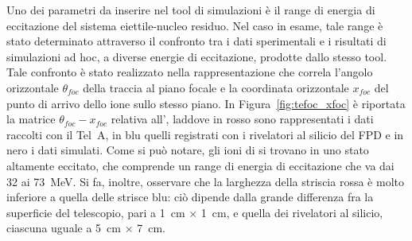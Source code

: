 
Uno dei parametri da inserire nel tool di simulazioni è il range di energia di eccitazione del sistema eiettile-nucleo residuo.
Nel caso in esame, tale range è stato determinato attraverso il confronto tra i dati sperimentali e i risultati di simulazioni ad hoc, a diverse energie di eccitazione, prodotte dallo stesso tool.
Tale confronto è stato realizzato nella rappresentazione che correla l'angolo orizzontale $\theta_{foc}$ della traccia al piano focale e la coordinata orizzontale $x_{foc}$ del punto di arrivo dello ione sullo stesso piano.
In Figura~\ref{fig:tefoc_xfoc} è riportata la matrice $\theta_{foc} - x_{foc}$ relativa all', laddove in rosso sono rappresentati i dati raccolti con il Tel~A, in blu quelli registrati con i rivelatori al silicio del FPD e in nero i dati simulati.
Come si può notare, gli ioni di  si trovano in uno stato altamente eccitato, che comprende un range di energia di eccitazione che va dai 32 ai 73~MeV.
Si fa, inoltre, osservare che la larghezza della striscia rossa è molto inferiore a quella delle strisce blu: ciò dipende dalla grande differenza fra la superficie del telescopio, pari a  1~cm $\times$ 1~cm, e quella dei rivelatori al silicio, ciascuna uguale a 5~cm $\times$ 7~cm.










